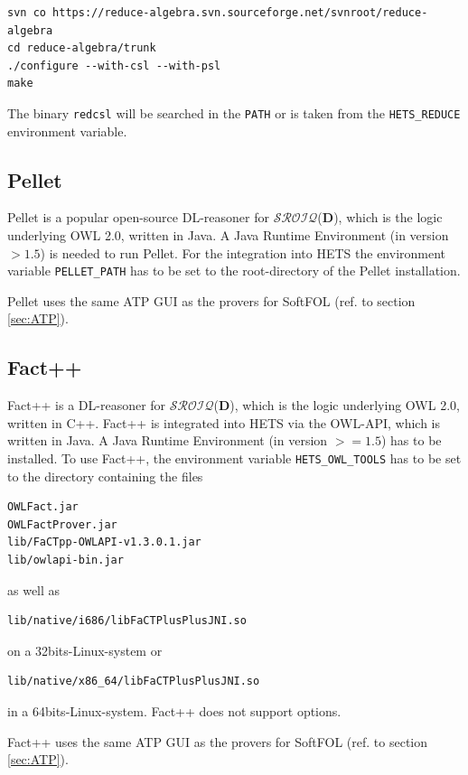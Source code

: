 \documentclass{article}
\newcommand{\normalTEXTSC}[2]{{#1\scriptsize#2}}
\newcommand     {\Hets}{\normalTEXTSC{H}{ETS}\xspace}
\newcommand{\SROIQ}{$\mathcal{SROIQ}$(\textbf{D})\xspace}
\newcommand{\DL}{DL\xspace}
\begin{document}
\begin{verbatim}
svn co https://reduce-algebra.svn.sourceforge.net/svnroot/reduce-algebra
cd reduce-algebra/trunk
./configure --with-csl --with-psl
make
\end{verbatim}

The binary \texttt{redcsl} will be searched in the \texttt{PATH} or is taken
from the \texttt{HETS\_REDUCE} environment variable.

\subsection{Pellet}
Pellet is a popular open-source \DL-reasoner for \SROIQ, which is the logic
underlying OWL 2.0, written in Java. A Java Runtime Environment (in version $> 1.5$)
is needed to run Pellet. For the integration into \Hets the environment variable
\verb+PELLET_PATH+ has to be set to the root-directory of the Pellet installation.

Pellet uses the same ATP GUI as the provers for SoftFOL (ref. to section
\ref{sec:ATP}).
\subsection{Fact++}
Fact++ is a \DL-reasoner for \SROIQ, which is the logic underlying OWL 2.0, written in
C++. Fact++ is integrated into \Hets via the OWL-API, which is written in Java.
A Java Runtime Environment (in version $>= 1.5$) has to be installed. To use Fact++,
the environment variable \verb+HETS_OWL_TOOLS+ has to be set to the directory
containing the files
\begin{verbatim}
OWLFact.jar
OWLFactProver.jar
lib/FaCTpp-OWLAPI-v1.3.0.1.jar
lib/owlapi-bin.jar
\end{verbatim}
as well as
\begin{verbatim}
lib/native/i686/libFaCTPlusPlusJNI.so
\end{verbatim}
on a 32bits-Linux-system or
\begin{verbatim}
lib/native/x86_64/libFaCTPlusPlusJNI.so
\end{verbatim}
in a 64bits-Linux-system. Fact++ does not support options.

Fact++ uses the same ATP GUI as the provers for SoftFOL (ref. to section
\ref{sec:ATP}).
\end{document}
